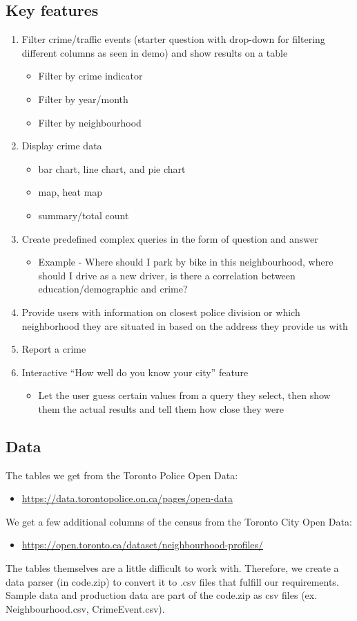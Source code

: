 \documentclass[12pt, a4paper]{article}
\begin{document}
\subsection*{Key features}
\begin{enumerate}
\item Filter crime/traffic events (starter question with drop-down for filtering different columns as seen in demo) and show results on a table
\begin{itemize}
    \color{blue}
    \item Filter by crime indicator
    \item Filter by year/month
    \item Filter by neighbourhood
\end{itemize}
\item Display crime data
\begin{itemize}
\item bar chart, line chart, and pie chart
\item map, heat map
\color{blue}
\item summary/total count
\end{itemize}
\item Create predefined complex queries in the form of question and answer
\begin{itemize}
    \item Example - Where should I park by bike in this neighbourhood, where should I drive as a new driver, is there a correlation between education/demographic and crime?
\end{itemize}
\item Provide users with information on closest police division or which neighborhood they are situated in based on the address they provide us with
\item Report a crime
\item Interactive “How well do you know your city” feature
\begin{itemize}
    \item Let the user guess certain values from a query they select, then show them the actual results and tell them how close they were
\end{itemize}
\end{enumerate}
\subsection*{Data}
The tables we get from the Toronto Police Open Data:
\begin{itemize}
    \item \url{https://data.torontopolice.on.ca/pages/open-data}
\end{itemize}
\color{blue}
We get a few additional columns of the census from the Toronto City Open Data:
\begin{itemize}
\color{blue}
 \item \url{https://open.toronto.ca/dataset/neighbourhood-profiles/}
\end{itemize}
\color{black}
The tables themselves are a little difficult to work with. Therefore, we create a data parser (in code.zip) to convert it to .csv files that fulfill our requirements. Sample data and production data are part of the code.zip as csv files (ex. Neighbourhood.csv, CrimeEvent.csv).
\end{document}
